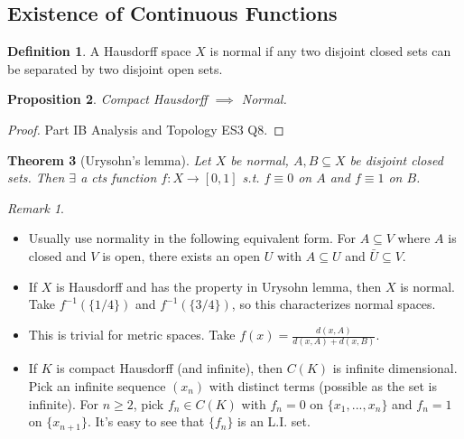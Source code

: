 \documentclass{article}
\theoremstyle{definition}
\newtheorem{defn}{Definition}[section]
\theoremstyle{remark}
\newtheorem{rem}{Remark}
\theoremstyle{plain}
\newtheorem{thm}[defn]{Theorem}
\newtheorem{prop}[defn]{Proposition}
\begin{document}
\subsection{Existence of Continuous Functions}
\begin{defn}
    A Hausdorff space $X$ is normal if any two disjoint closed sets can be separated by two disjoint open sets.
\end{defn}
\begin{prop}
    Compact Hausdorff $\implies$ Normal.
\end{prop}
\begin{proof}
    Part IB Analysis and Topology ES3 Q8.
\end{proof}
\begin{thm}[Urysohn's lemma]
    Let $X$ be normal, $A,B\subseteq X$ be disjoint closed sets. Then $\exists$ a cts function $f:X\to[0,1]$ s.t. $f\equiv 0$ on $A$ and $f\equiv 1$ on $B$. 
\end{thm}
\begin{rem}
    \begin{itemize}
        \item Usually use normality in the following equivalent form. For $A\subseteq V$ where $A$ is closed and $V$ is open, there exists an open $U$ with $A\subseteq U$ and $\bar U\subseteq V$.
        \item If $X$ is Hausdorff and has the property in Urysohn lemma, then $X$ is normal. Take $f^{-1}(\{1/4\})$ and $f^{-1}(\{3/4\})$, so this characterizes normal spaces.
        \item This is trivial for metric spaces. Take $f(x)=\frac{d(x,A)}{d(x,A)+d(x,B)}$.
        \item If $K$ is compact Hausdorff (and infinite), then $C(K)$ is infinite dimensional. Pick an infinite sequence $(x_n)$ with distinct terms (possible as the set is infinite). For $n\ge 2$, pick $f_n\in C(K)$ with $f_n=0$ on $\{x_1,...,x_n\}$ and $f_n=1$ on $\{x_{n+1}\}$. It's easy to see that $\{f_n\}$ is an L.I. set.
     \end{itemize}
\end{rem}
\end{document}
